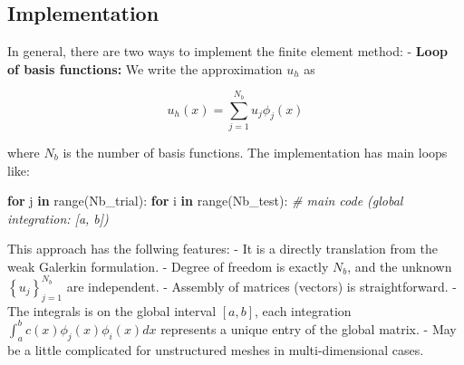 \documentclass[11pt]{article}
\newenvironment{Shaded}{}{}
\newcommand{\KeywordTok}[1]{\textcolor[rgb]{0.00,0.44,0.13}{\textbf{{#1}}}}
\newcommand{\CommentTok}[1]{\textcolor[rgb]{0.38,0.63,0.69}{\textit{{#1}}}}
\newcommand{\NormalTok}[1]{{#1}}
\newcommand{\ControlFlowTok}[1]{\textcolor[rgb]{0.00,0.44,0.13}{\textbf{{#1}}}}
\newcommand{\BuiltInTok}[1]{{#1}}
\begin{document}
    \subsection{Implementation}\label{implementation}

In general, there are two ways to implement the finite element method: -
\textbf{Loop of basis functions:} We write the approximation \(u_h\) as

\begin{equation}
    u_h(x) = \sum\limits_{j = 1}^{N_b}u_j\phi_j(x)
\end{equation}

where \(N_b\) is the number of basis functions. The implementation has
main loops like:

\begin{Shaded}
\begin{Highlighting}[]
    \ControlFlowTok{for}\NormalTok{ j }\KeywordTok{in} \BuiltInTok{range}\NormalTok{(Nb_trial): }
        \ControlFlowTok{for}\NormalTok{ i }\KeywordTok{in} \BuiltInTok{range}\NormalTok{(Nb_test):}
            \CommentTok{# main code (global integration: [a, b])}
\end{Highlighting}
\end{Shaded}

This approach has the follwing features: - It is a directly translation
from the weak Galerkin formulation. - Degree of freedom is exactly
\(N_b\), and the unknown \(\left\{u_j\right\}_{j=1}^{N_b}\) are
independent. - Assembly of matrices (vectors) is straightforward. - The
integrals is on the global interval \([a,b]\), each integration
\(\int_a^b c(x)\phi_j(x)\phi_i(x)dx\) represents a unique entry of the
global matrix. - May be a little complicated for unstructured meshes in
multi-dimensional cases.
\end{document}
